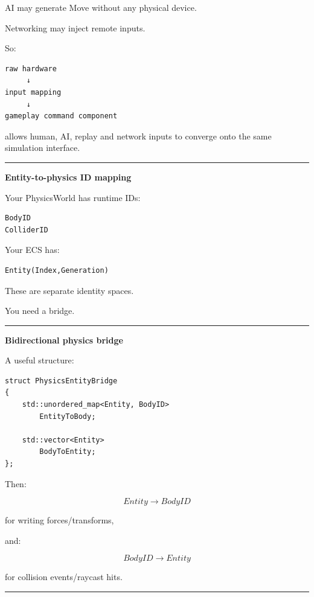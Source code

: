 AI may generate Move without any physical device.

Networking may inject remote inputs.

So:

\begin{verbatim}
raw hardware
     ↓
input mapping
     ↓
gameplay command component
\end{verbatim}

allows human, AI, replay and network inputs to converge onto the same simulation interface.

\begin{center}\rule{0.5\linewidth}{0.5pt}\end{center}

\textbf{Entity-to-physics ID mapping}

Your PhysicsWorld has runtime IDs:

\begin{verbatim}
BodyID
ColliderID
\end{verbatim}

Your ECS has:

\begin{verbatim}
Entity(Index,Generation)
\end{verbatim}

These are separate identity spaces.

You need a bridge.

\begin{center}\rule{0.5\linewidth}{0.5pt}\end{center}

\textbf{Bidirectional physics bridge}

A useful structure:

\begin{verbatim}
struct PhysicsEntityBridge
{
    std::unordered_map<Entity, BodyID>
        EntityToBody;

    std::vector<Entity>
        BodyToEntity;
};
\end{verbatim}

Then:

\[
Entity\rightarrow BodyID
\]

for writing forces/transforms,

and:

\[
BodyID\rightarrow Entity
\]

for collision events/raycast hits.

\begin{center}\rule{0.5\linewidth}{0.5pt}\end{center}

